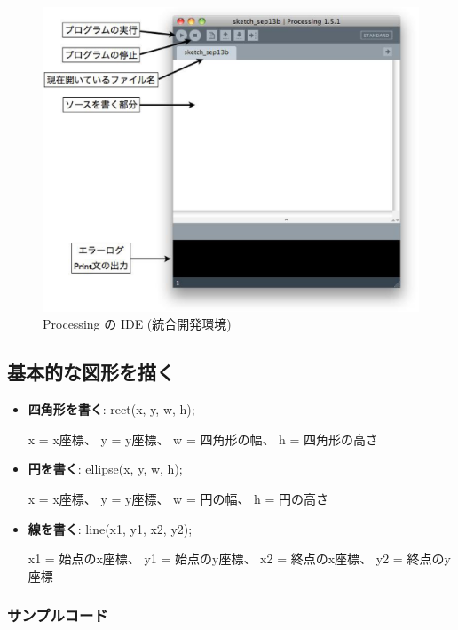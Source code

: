 \documentclass[11pt,a4paper]{jarticle}
\begin{document}
\begin{figure}[h]
 \centering
 \includegraphics[width=0.5\columnwidth]{img/processing_ide.eps}
 \caption{Processing の IDE (統合開発環境)}
\end{figure}

\subsection*{基本的な図形を描く}

\begin{itemize}
 \item \textbf{四角形を書く}: rect(x, y, w, h);

       x = x座標、
       y = y座標、
       w = 四角形の幅、
       h = 四角形の高さ

 \item \textbf{円を書く}: ellipse(x, y, w, h);
       
       x = x座標、
       y = y座標、
       w = 円の幅、
       h = 円の高さ

 \item \textbf{線を書く}: line(x1, y1, x2, y2);
       
       x1 = 始点のx座標、
       y1 = 始点のy座標、
       x2 = 終点のx座標、
       y2 = 終点のy座標


\end{itemize}

\subsubsection*{サンプルコード}
\end{document}
